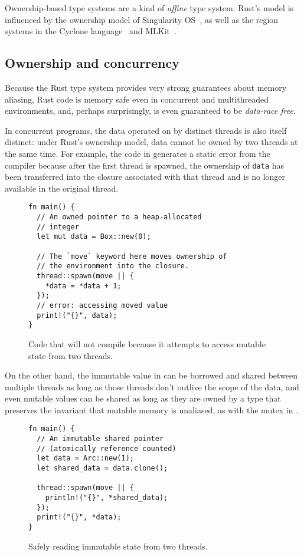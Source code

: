 Ownership-based type systems are a kind of \emph{affine} type system. Rust's
model is influenced by the ownership model of Singularity OS~\cite{singularity},
as well as the region systems in the Cyclone language~\cite{cyclone} and MLKit~\cite{mlkit}.

\subsection{Ownership and concurrency}

Because the Rust type system provides very strong guarantees about memory aliasing,
Rust code is memory safe even in concurrent and multithreaded environments,
and, perhaps surprisingly, is even guaranteed to be \emph{data-race free}.

In concurrent programs, the data operated on by distinct threads is also itself distinct:
under Rust's ownership model, data cannot be owned by two threads at the same time.
For example, the code in  generates a static error from the compiler because
after the first thread is spawned, the ownership of \lstinline{data} has been transferred into the
closure associated with that thread and is no longer available in the original thread.
\begin{figure}
\begin{lstlisting}
fn main() {
  // An owned pointer to a heap-allocated
  // integer
  let mut data = Box::new(0);

  // The `move` keyword here moves ownership of
  // the environment into the closure.
  thread::spawn(move || {
    *data = *data + 1;
  });
  // error: accessing moved value
  print!("{}", data);
}
\end{lstlisting}
  \caption{Code that will not compile because it attempts to access mutable state from two threads.}
  \label{fig:bad-concurrency}
\end{figure}

On the other hand, the immutable value in  can be borrowed and shared between multiple threads as long as those threads don't outlive the scope of the data, and even mutable values can be shared as long
as they are owned by a type that preserves the invariant that mutable memory is unaliased, as with the
mutex in .

\begin{figure}
\begin{lstlisting}
fn main() {
  // An immutable shared pointer
  // (atomically reference counted)
  let data = Arc::new(1);
  let shared_data = data.clone();

  thread::spawn(move || {
    println!("{}", *shared_data);
  });
  print!("{}", *data);
}
\end{lstlisting}
  \caption{Safely reading immutable state from two threads.}
  \label{fig:shared-concurrency}
\end{figure}

